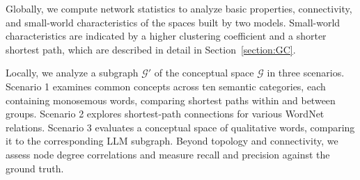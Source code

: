 Globally, we compute network statistics to analyze basic properties, connectivity, and small-world characteristics of the spaces built by two models. Small-world characteristics are indicated by a higher clustering coefficient and a shorter shortest path, which are described in detail in Section~\ref{section:GC}.


Locally, we analyze a subgraph \(\mathcal{G'}\) of the conceptual space \(\mathcal{G}\) in three scenarios. Scenario 1 examines common concepts across ten semantic categories, each containing monosemous words, comparing shortest paths within and between groups. Scenario 2 explores shortest-path connections for various WordNet relations. Scenario 3 evaluates a conceptual space of qualitative words, comparing it to the corresponding LLM subgraph. Beyond topology and connectivity, we assess node degree correlations and measure recall and precision against the ground truth.


